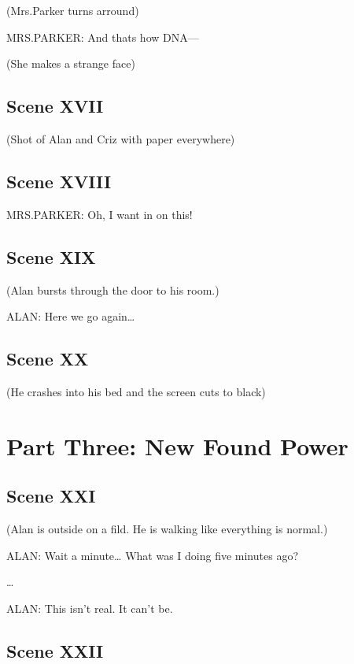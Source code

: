 \documentclass{article}
\begin{document}
(Mrs.Parker turns arround)

\noindent
MRS.PARKER: And thats how DNA---

\noindent
(She makes a strange face)

\subsection[017 - XVII]{Scene XVII}

(Shot of Alan and Criz with paper everywhere)

\subsection[018 - XVIII]{Scene XVIII}

MRS.PARKER: Oh, I want in on this!

\subsection[019 - XIX]{Scene XIX}

(Alan bursts through the door to his room.)

\noindent
ALAN: Here we go again\ldots{}

\subsection[020 - XX]{Scene XX}

(He crashes into his bed and the screen cuts to black)

\section{Part Three: New Found Power}
\subsection[021 - XXI]{Scene XXI}

(Alan is outside on a fild. He is walking like everything is normal.)

\noindent
ALAN: Wait a minute\ldots{} What was I doing five minutes ago?

\noindent
\ldots{}

\noindent
ALAN: This isn't real. It can't be.

\subsection[022 - XXII]{Scene XXII}
\end{document}
